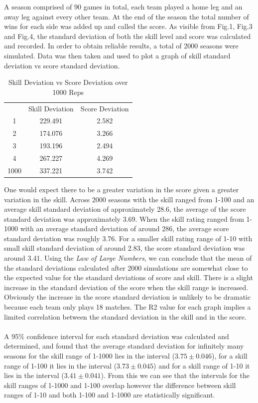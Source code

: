 \documentclass[12pt]{article}
\begin{document}
A season comprised of 90 games in total, each team played a home leg and an away leg against every other team. At the end of the season the total number of wins for each side was added up and called the score. As visible from Fig.1, Fig.3 and Fig.4, the standard deviation of both the skill level and score was calculated and recorded. In order to obtain reliable results, a total of 2000 seasons were simulated. Data was then taken and used to plot a graph of skill standard deviation vs score standard deviation.
\begin{table}[h]
\centering
\begin{tabular}{ccc}
     & Skill Deviation & Score Deviation \\
1    & 229.491         & 2.582           \\
2    & 174.076         & 3.266           \\
3    & 193.196         & 2.494           \\
4    & 267.227         & 4.269           \\
1000 & 337.221         & 3.742          
\end{tabular}
\caption{Skill Deviation vs Score Deviation over 1000 Reps}
\end{table}
One would expect there to be a greater variation in the score given a greater variation in the skill. Across 2000 seasons with the skill ranged from 1-100 and an average skill standard deviation of approximately 28.6, the average of the score standard deviation was approximately 3.69. When the skill rating ranged from 1-1000 with an average standard deviation of around 286, the average score standard deviation was roughly 3.76. For a smaller skill rating range of 1-10 with small skill standard deviation of around 2.83, the score standard deviation was around 3.41. Using the \emph{Law of Large Numbers}, we can conclude that the mean of the standard deviations calculated after 2000 simulations are somewhat close to the expected value for the standard deviations of score and skill. There is a slight increase in the standard deviation of the score when the skill range is increased. Obviously the increase in the score standard deviation is unlikely to be dramatic because each team only plays 18 matches. The R2 value for each graph implies a limited correlation between the standard deviation in the skill and in the score.\cite{dekker}
\\\\
A 95\% confidence interval for each standard deviation was calculated and determined, and found that the average standard deviation for infinitely many seasons for the skill range of 1-1000 lies in the interval ($3.75 \pm 0.046$), for a skill range of 1-100 it lies in the interval ($3.73 \pm 0.045$) and for a skill range of 1-10 it lies in the interval ($3.41 \pm 0.041$). From this we can see that the intervals for the skill ranges of 1-1000 and 1-100 overlap however the difference between skill ranges of 1-10 and both 1-100 and 1-1000 are statistically significant.
\end{document}
